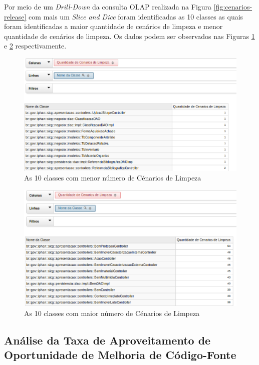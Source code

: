 Por meio de um \textit{Drill-Down} da consulta OLAP realizada na Figura \ref{fig:cenarios-release} com mais um \textit{Slice and Dice} foram identificadas as 10 classes as quais foram identificadas a maior quantidade de cenários de limpeza e menor quantidade de cenários de limpeza. Os dados podem ser observados nas Figuras \ref{fig:best-10-cenarios} e \ref{fig:worst-10-cenarios} respectivamente.

\begin{figure}[ht!]
\centering
\includegraphics[keepaspectratio=true,scale=0.6]{figuras/10-worst.eps}
\caption{As 10 classes com menor número de Cénarios de Limpeza}
\label{fig:best-10-cenarios}
\end{figure}
\FloatBarrier

\begin{figure}[ht!]
\centering
\includegraphics[keepaspectratio=true,scale=0.6]{figuras/10-best.eps}
\caption{As 10 classes com maior número de Cénarios de Limpeza}
\label{fig:worst-10-cenarios}
\end{figure}
\FloatBarrier


\subsection{Análise da Taxa de Aproveitamento de Oportunidade de Melhoria de Código-Fonte}

